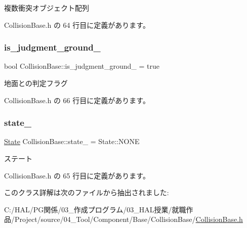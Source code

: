 複数衝突オブジェクト配列 



 Collision\+Base.\+h の 64 行目に定義があります。

\mbox{\label{class_collision_base_acc56eed7a6366d77bb2b80810f0a4ea7}} 
\subsubsection{\texorpdfstring{is\+\_\+judgment\+\_\+ground\+\_\+}{is\_judgment\_ground\_}}
{\footnotesize\ttfamily bool Collision\+Base\+::is\+\_\+judgment\+\_\+ground\+\_\+ = true\hspace{0.3cm}{\ttfamily [private]}}



地面との判定フラグ 



 Collision\+Base.\+h の 66 行目に定義があります。

\mbox{\label{class_collision_base_a00000e1adbe3869939c8119a4ae830d0}} 
\subsubsection{\texorpdfstring{state\+\_\+}{state\_}}
{\footnotesize\ttfamily \mbox{\hyperlink{class_collision_base_a4dd1ed00099a19c0176913af93c4e365}{State}} Collision\+Base\+::state\+\_\+ = State\+::\+N\+O\+NE\hspace{0.3cm}{\ttfamily [private]}}



ステート 



 Collision\+Base.\+h の 65 行目に定義があります。



このクラス詳解は次のファイルから抽出されました\+:\begin{DoxyCompactItemize}
\item 
C\+:/\+H\+A\+L/\+P\+G関係/03\+\_\+作成プログラム/03\+\_\+\+H\+A\+L授業/就職作品/\+Project/source/04\+\_\+\+Tool/\+Component/\+Base/\+Collision\+Base/\mbox{\hyperlink{_collision_base_8h}{Collision\+Base.\+h}}\end{DoxyCompactItemize}
